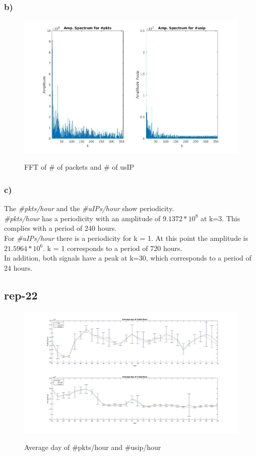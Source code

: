 \subsubsection*{b)}
\begin{figure}[H]
\center
\includegraphics[width=.7\textwidth]{./chapters/plots/rep21b.jpg}\\
\caption{ FFT of \# of packets and \# of usIP  }
\end{figure}

\subsubsection*{c)}
The \textit{\#pkts/hour} and the \textit{\#uIPs/hour} show periodicity.\\

\textit{\#pkts/hour} has a periodicity with an amplitude of $9.1372 * 10^8$ at k=3. This complies with a period of 240 hours. \\

For \textit{\#uIPs/hour} there is a periodicity for k = 1. At this point the amplitude is $21.5964 * 10^6$. k = 1 corresponds to a period of 720 hours. \\

In addition, both signals have a peak at k=30, which corresponds to a period of 24 hours.

\subsection*{rep-22}
\begin{figure}[H]
\center
\includegraphics[width=1\textwidth]{./chapters/plots/rep-22.jpg}\\
\caption{ Average day of \#pkts/hour and \#usip/hour }
\end{figure}

